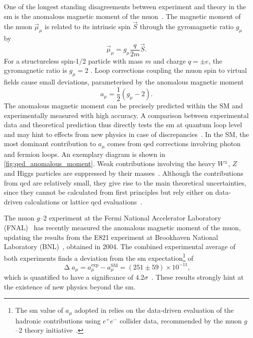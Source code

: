 One of the longest standing disagreements between experiment and theory in the \gls{sm} is the anomalous magnetic moment of the muon~\cite{pdg2020}. The magnetic moment of the muon $\vec{\mu}_\mu$ is related to its intrinsic spin $\vec{S}$ through the gyromagnetic ratio $g_\mu$ by
\begin{equation}
	\vec{\mu}_\mu = g_\mu \frac{q}{2m} \vec{S}.
\end{equation}
For a structureless spin-1/2 particle with mass $m$ and charge $q=\pm e$, the gyromagnetic ratio is \mbox{$g_\mu = 2$} \cite{Bennett:2006fi}. Loop corrections coupling the muon spin to virtual fields cause small deviations, parameterised by the anomalous magnetic moment
\begin{equation}
	a_\mu = \frac{1}{2}(g_\mu-2).
\end{equation}
The anomalous magnetic moment can be precisely predicted within the SM and experimentally measured with high accuracy. A comparison between experimental data and theoretical prediction thus directly tests the \gls{sm} at quantum loop level and may hint to effects from new physics in case of discrepancies~\cite{baer_tata_2006}.
In the SM, the most dominant contribution to $a_\mu$ comes from \gls{qed} corrections involving photon and fermion loops.
An exemplary diagram is shown in \cref{fig:qed_anomalous_moment}. Weak contributions involving the heavy $W^\pm$, $Z$ and Higgs particles are suppressed by their masses~\cite{Aoyama:2020ynm}.
Although the contributions from \gls{qcd} are relatively small, they give rise to the main theoretical uncertainties, since they cannot be calculated from first principles but rely either on data-driven calculations or lattice \gls{qcd} evaluations~\cite{Aoyama:2020ynm}.

The muon $g$--2 experiment at the Fermi National Accelerator Laboratory (FNAL)~\cite{Abi:2021gix} has recently measured the anomalous magnetic moment of the muon, updating the results from the E821 experiment at Brookhaven National Laboratory (BNL)~\cite{Bennett:2006fi}, obtained in 2004. The combined experimental average of both experiments finds a deviation from the \gls{sm} expectation\footnote{The \gls{sm} value of $a_\mu$ adopted in \cite{Abi:2021gix} relies on the data-driven evaluation of the hadronic contributions using $e^+e^-$ collider data, recommended by the muon $g$--2 theory initiative~\cite{Aoyama:2020ynm}.} of
\begin{equation}
	\upDelta a_\mu = a^\mathrm{exp}_\mu - a^\mathrm{SM}_\mu = (251\pm59)\times 10^{-11},
\end{equation}
which is quantified to have a significance of $4.2\sigma$~\cite{Abi:2021gix}. These results strongly hint at the existence of new physics beyond the \gls{sm}.

